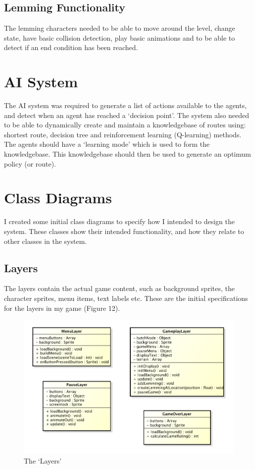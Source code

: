 \documentclass[a4paper,oneside]{report}
\begin{document}
\subsection{Lemming Functionality}

The lemming characters needed to be able to move around the level, change state, have basic collision detection, play basic animations and to be able to detect if an end condition has been reached.

\section{AI System}

The AI system was required to generate a list of actions available to the agents, and detect when an agent has reached a `decision point'. The system also needed to be able to dynamically create and maintain a knowledgebase of routes using: shortest route, decision tree and reinforcement learning (Q-learning) methods. The agents should have a `learning mode' which is used to form the knowledgebase. This knowledgebase should then be used to generate an optimum policy (or route).

\section{Class Diagrams}

I created some initial class diagrams to specify how I intended to design the system. These classes show their intended functionality, and how they relate to other classes in the system. 

\subsection{Layers}

The layers contain the actual game content, such as background sprites, the character sprites, menu items, text labels etc. These are the initial specifications for the layers in my game (Figure 12).

\begin{figure}[h!]
  \centering
    \includegraphics[width=130mm]{sources/images/Layers}
    \caption{The `Layers'}
\end{figure}
\end{document}
